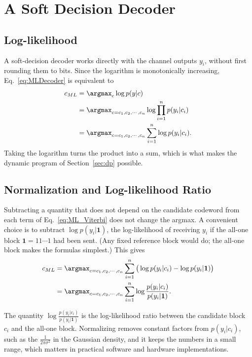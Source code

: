 \section{A Soft Decision Decoder}\label{sec:soft}
\subsection{Log-likelihood}
A soft-decision decoder works directly with the channel outputs \(y_i\), without first rounding them to bits. Since the logarithm is monotonically increasing, Eq.~\ref{eq:MLDecoder} is equivalent to
\begin{align}
    c_{ML} &= \argmax_{c} \log p(y|c) \nonumber \\
           &= \argmax_{c=c_1, c_2, \cdots, c_n} \log \prod_{i=1}^{n}p(y_i|c_i) \nonumber \\
           &= \argmax_{c=c_1, c_2, \cdots, c_n} \sum_{i=1}^{n} \log p(y_i|c_i). \label{eq:ML_Viterbi}
\end{align}
Taking the logarithm turns the product into a sum, which is what makes the dynamic program of Section~\ref{sec:dp} possible.

\subsection{Normalization and Log-likelihood Ratio}
Subtracting a quantity that does not depend on the candidate codeword from each term of Eq.~\ref{eq:ML_Viterbi} does not change the argmax. A convenient choice is to subtract \(\log p(y_i|\mathbf{1})\), the log-likelihood of receiving \(y_i\) if the all-one block \(\mathbf{1} = 11\cdots1\) had been sent. (Any fixed reference block would do; the all-one block makes the formulas simplest.) This gives
\begin{align}
    c_{ML} &= \argmax_{c=c_1, c_2, \cdots, c_n} \sum_{i=1}^{n} \big(\log p(y_i|c_i) - \log p(y_i|\mathbf{1})\big) \nonumber \\
    &=\argmax_{c=c_1, c_2, \cdots, c_n} \sum_{i=1}^{n} \log \frac{p(y_i|c_i)}{p(y_i|\mathbf{1})}. \label{eq:CovnCML}
\end{align}

The quantity \(\log \frac{p(y_i|c_i)}{p(y_i|\mathbf{1})}\) is the log-likelihood ratio between the candidate block \(c_i\) and the all-one block. Normalizing removes constant factors from \(p(y_i|c_i)\), such as the \(\frac{1}{2\pi\sigma^2}\) in the Gaussian density, and it keeps the numbers in a small range, which matters in practical software and hardware implementations.

